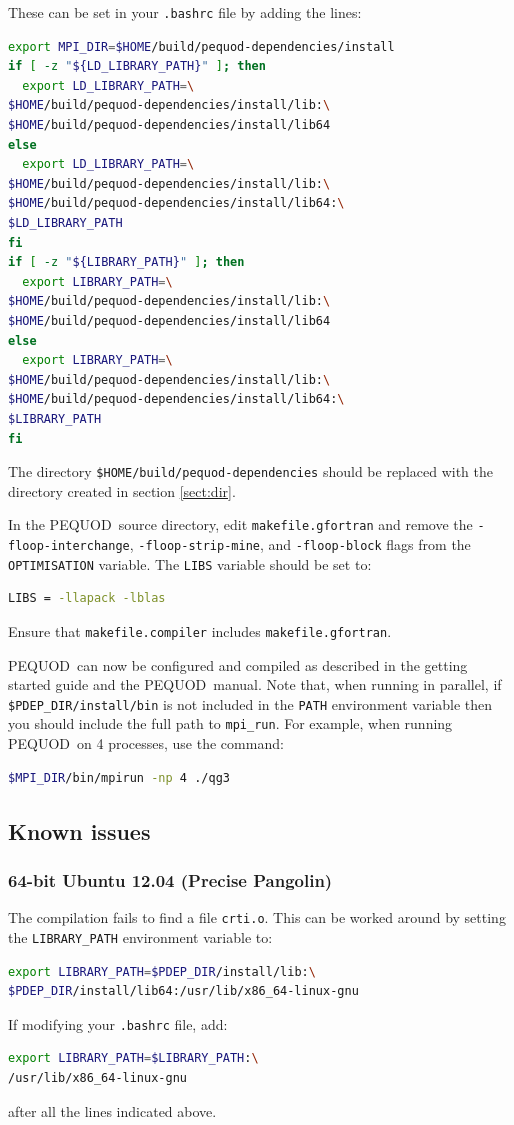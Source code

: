 \documentclass[a4paper]{article}
\newcommand{\pequod}{PEQUOD}
\begin{document}
These can be set in your \verb+.bashrc+ file by adding the lines:
\begin{lstlisting}[language = bash, frame = single]
export MPI_DIR=$HOME/build/pequod-dependencies/install
if [ -z "${LD_LIBRARY_PATH}" ]; then
  export LD_LIBRARY_PATH=\
$HOME/build/pequod-dependencies/install/lib:\
$HOME/build/pequod-dependencies/install/lib64
else
  export LD_LIBRARY_PATH=\
$HOME/build/pequod-dependencies/install/lib:\
$HOME/build/pequod-dependencies/install/lib64:\
$LD_LIBRARY_PATH
fi
if [ -z "${LIBRARY_PATH}" ]; then
  export LIBRARY_PATH=\
$HOME/build/pequod-dependencies/install/lib:\
$HOME/build/pequod-dependencies/install/lib64
else
  export LIBRARY_PATH=\
$HOME/build/pequod-dependencies/install/lib:\
$HOME/build/pequod-dependencies/install/lib64:\
$LIBRARY_PATH
fi
\end{lstlisting}
The directory \verb+$HOME/build/pequod-dependencies+ should be replaced with the
directory created in section \ref{sect:dir}.

In the \pequod\ source directory, edit \verb+makefile.gfortran+ and remove the
\verb+-floop-interchange+, \verb+-floop-strip-mine+, and \verb+-floop-block+
flags from the \verb+OPTIMISATION+ variable. The \verb+LIBS+ variable should be
set to:
\begin{lstlisting}[language = bash, frame = single]
LIBS = -llapack -lblas
\end{lstlisting}
Ensure that \verb+makefile.compiler+ includes \verb+makefile.gfortran+.

\pequod\ can now be configured and compiled as described in the getting
started guide and the \pequod\ manual. Note that, when running in parallel,
if \verb+$PDEP_DIR/install/bin+ is not included in the \verb+PATH+ environment
variable then you should include the full path to \verb+mpi_run+. For example,
when running \pequod\ on 4 processes, use the command:
\begin{lstlisting}[language = bash, frame = single]
$MPI_DIR/bin/mpirun -np 4 ./qg3
\end{lstlisting}

\subsection{Known issues}

\subsubsection*{64-bit Ubuntu 12.04 (Precise Pangolin)}

The compilation fails to find a file \verb+crti.o+. This can be worked
around by setting the \verb+LIBRARY_PATH+ environment variable to:
\begin{lstlisting}[language = bash, frame = single]
export LIBRARY_PATH=$PDEP_DIR/install/lib:\
$PDEP_DIR/install/lib64:/usr/lib/x86_64-linux-gnu
\end{lstlisting}
If modifying your \verb+.bashrc+ file, add:
\begin{lstlisting}[language = bash, frame = single]
export LIBRARY_PATH=$LIBRARY_PATH:\
/usr/lib/x86_64-linux-gnu
\end{lstlisting}
after all the lines indicated above.

%
%
\end{document}
